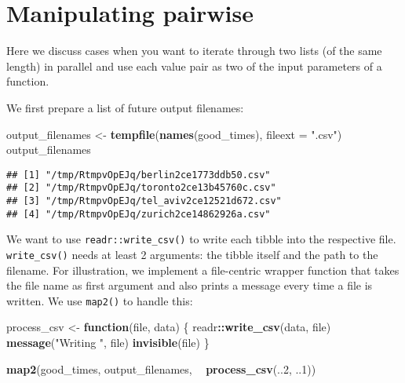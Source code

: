 \documentclass[]{book}
\newenvironment{Shaded}{\begin{snugshade}}{\end{snugshade}}
\newcommand{\ControlFlowTok}[1]{\textcolor[rgb]{0.13,0.29,0.53}{\textbf{#1}}}
\newcommand{\DataTypeTok}[1]{\textcolor[rgb]{0.13,0.29,0.53}{#1}}
\newcommand{\DecValTok}[1]{\textcolor[rgb]{0.00,0.00,0.81}{#1}}
\newcommand{\KeywordTok}[1]{\textcolor[rgb]{0.13,0.29,0.53}{\textbf{#1}}}
\newcommand{\NormalTok}[1]{#1}
\newcommand{\OperatorTok}[1]{\textcolor[rgb]{0.81,0.36,0.00}{\textbf{#1}}}
\newcommand{\StringTok}[1]{\textcolor[rgb]{0.31,0.60,0.02}{#1}}
\begin{document}
\hypertarget{manipulating-pairwise}{%
\section{Manipulating pairwise}\label{manipulating-pairwise}}

Here we discuss cases when you want to iterate through two lists (of the same length) in parallel and use each value pair as two of the input parameters of a function.

We first prepare a list of future output filenames:

\begin{Shaded}
\begin{Highlighting}[]
\NormalTok{output_filenames <-}\StringTok{ }\KeywordTok{tempfile}\NormalTok{(}\KeywordTok{names}\NormalTok{(good_times), }\DataTypeTok{fileext =} \StringTok{".csv"}\NormalTok{)}
\NormalTok{output_filenames}
\end{Highlighting}
\end{Shaded}

\begin{verbatim}
## [1] "/tmp/RtmpvOpEJq/berlin2ce1773ddb50.csv"  
## [2] "/tmp/RtmpvOpEJq/toronto2ce13b45760c.csv" 
## [3] "/tmp/RtmpvOpEJq/tel_aviv2ce12521d672.csv"
## [4] "/tmp/RtmpvOpEJq/zurich2ce14862926a.csv"
\end{verbatim}

We want to use \texttt{readr::write\_csv()} to write each tibble into the respective file.
\texttt{write\_csv()} needs at least 2 arguments: the tibble itself and the path to the filename.
For illustration, we implement a file-centric wrapper function that takes the file name as first argument and also prints a message every time a file is written.
We use \texttt{map2()} to handle this:

\begin{Shaded}
\begin{Highlighting}[]
\NormalTok{process_csv <-}\StringTok{ }\ControlFlowTok{function}\NormalTok{(file, data) \{}
\NormalTok{  readr}\OperatorTok{::}\KeywordTok{write_csv}\NormalTok{(data, file)}
  \KeywordTok{message}\NormalTok{(}\StringTok{"Writing "}\NormalTok{, file)}
  \KeywordTok{invisible}\NormalTok{(file)}
\NormalTok{\}}

\KeywordTok{map2}\NormalTok{(good_times, output_filenames, }\OperatorTok{~}\StringTok{ }\KeywordTok{process_csv}\NormalTok{(..}\DecValTok{2}\NormalTok{, ..}\DecValTok{1}\NormalTok{))}
\end{Highlighting}
\end{Shaded}
\end{document}
